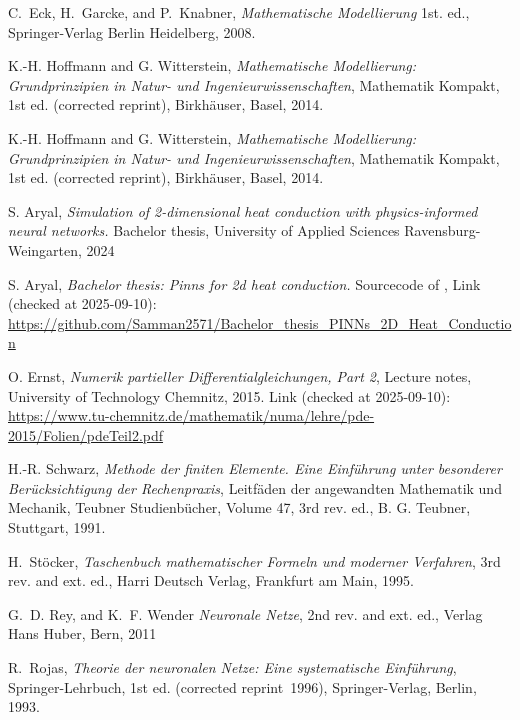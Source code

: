 \documentclass[a4paper,11pt]{article}
\begin{document}
\newpage
\begin{thebibliography}{9}

C.~Eck, H.~Garcke, and P.~Knabner,
\emph{Mathematische Modellierung}
1st. ed., Springer-Verlag Berlin Heidelberg, 2008.

K.-H. Hoffmann and G. Witterstein, 
\emph{Mathematische Modellierung: Grundprinzipien in Natur- und Ingenieurwissenschaften}, 
Mathematik Kompakt, 1st ed. (corrected reprint), Birkhäuser, Basel, 2014.

K.-H. Hoffmann and G. Witterstein, 
\emph{Mathematische Modellierung: Grundprinzipien in Natur- und Ingenieurwissenschaften}, 
Mathematik Kompakt, 1st ed. (corrected reprint), Birkhäuser, Basel, 2014.

S. Aryal, 
\emph{Simulation of 2-dimensional heat conduction with physics-informed neural networks.}
Bachelor thesis, University of Applied Sciences Ravensburg-Weingarten, 2024

S. Aryal, 
\emph{Bachelor thesis: Pinns for 2d heat conduction.}
Sourcecode of \cite{aryal2024a}, Link (checked at 2025-09-10): \url{https://github.com/Samman2571/Bachelor_thesis_PINNs_2D_Heat_Conduction}

O. Ernst,
\emph{Numerik partieller Differentialgleichungen, Part 2}, 
Lecture notes, University of Technology Chemnitz, 2015.
Link (checked at 2025-09-10): \url{https://www.tu-chemnitz.de/mathematik/numa/lehre/pde-2015/Folien/pdeTeil2.pdf}

H.-R. Schwarz,
\emph{Methode der finiten Elemente. Eine Einführung unter besonderer Berücksichtigung der Rechenpraxis},
Leitfäden der angewandten Mathematik und Mechanik, Teubner Studienbücher, Volume 47, 3rd rev. ed., B. G. Teubner, Stuttgart, 1991.

H.~Stöcker, 
\emph{Taschenbuch mathematischer Formeln und moderner Verfahren}, 
3rd rev. and ext. ed., Harri Deutsch Verlag, Frankfurt am Main, 1995.

G.~D. Rey, and K.~F. Wender
\emph{Neuronale Netze}, 
2nd rev. and ext. ed., Verlag Hans Huber, Bern, 2011

R.~Rojas,
\emph{Theorie der neuronalen Netze: Eine systematische Einführung},
Springer-Lehrbuch, 1st ed. (corrected reprint 1996), Springer-Verlag, Berlin, 1993.




\end{thebibliography}
\end{document}
